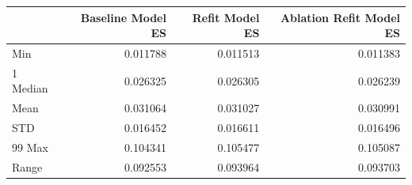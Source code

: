 \begin{tabular}{lrrr}
\toprule
 & Baseline Model ES & Refit Model ES & Ablation Refit Model ES \\
\midrule
Min & 0.011788 & 0.011513 & 0.011383 \\
1%
Median & 0.026325 & 0.026305 & 0.026239 \\
Mean & 0.031064 & 0.031027 & 0.030991 \\
STD & 0.016452 & 0.016611 & 0.016496 \\
99%
Max & 0.104341 & 0.105477 & 0.105087 \\
Range & 0.092553 & 0.093964 & 0.093703 \\
\bottomrule
\end{tabular}
